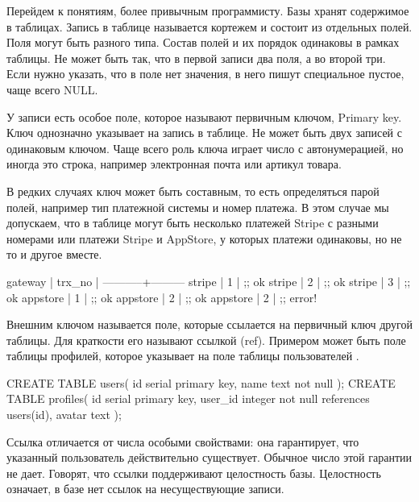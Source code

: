 Перейдем к понятиям, более привычным программисту. Базы хранят содержимое в таблицах. Запись в таблице называется кортежем и состоит из отдельных полей. Поля могут быть разного типа. Состав полей и их порядок одинаковы в рамках таблицы. Не может быть так, что в первой записи два поля, а во второй три. Если нужно указать, что в поле нет значения, в него пишут специальное пустое, чаще всего NULL.


У записи есть особое поле, которое называют первичным ключом, Primary key. Ключ однозначно указывает на запись в таблице. Не может быть двух записей с одинаковым ключом. Чаще всего роль ключа играет число с автонумерацией, но иногда это строка, например электронная почта или артикул товара.

В редких случаях ключ может быть составным, то есть определяться парой полей, например тип платежной системы и номер платежа. В этом случае мы допускаем, что в таблице могут быть несколько платежей Stripe с разными номерами или платежи Stripe и AppStore, у которых платежи одинаковы, но не то и другое вместе.

\begin{english}
  \begin{text}
 gateway   | trx_no |
-----------+---------
 stripe    | 1      | ;; ok
 stripe    | 2      | ;; ok
 stripe    | 3      | ;; ok
 appstore  | 1      | ;; ok
 appstore  | 2      | ;; ok
 appstore  | 2      | ;; error!
  \end{text}
\end{english}

Внешним ключом называется поле, которые ссылается на первичный ключ другой таблицы. Для краткости его называют ссылкой (ref). Примером может быть поле  таблицы профилей, которое указывает на поле  таблицы пользователей .


\begin{english}
  \begin{sql/lines}
CREATE TABLE users(
    id   serial primary key,
    name text not null
);
CREATE TABLE profiles(
    id      serial primary key,
    user_id integer not null references users(id),
    avatar  text
);
  \end{sql/lines}
\end{english}

Ссылка отличается от числа особыми свойствами: она гарантирует, что указанный пользователь действительно существует. Обычное число этой гарантии не дает. Говорят, что ссылки поддерживают целостность базы. Целостность означает, в базе нет ссылок на несуществующие записи.

